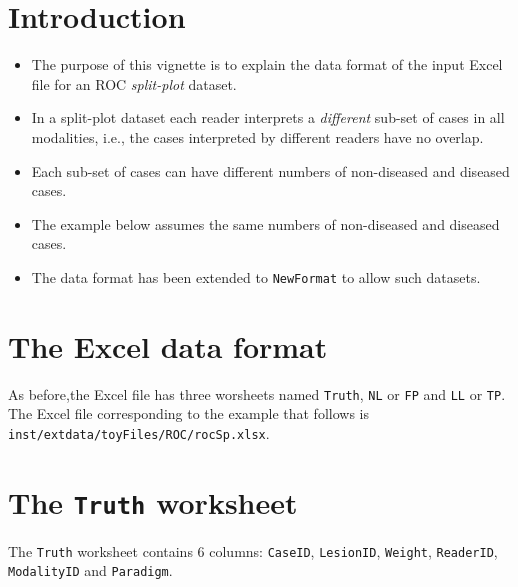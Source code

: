 \documentclass[]{book}
\providecommand{\tightlist}{%
  \setlength{\itemsep}{0pt}\setlength{\parskip}{0pt}}
\begin{document}
\hypertarget{introduction-2}{%
\section{Introduction}\label{introduction-2}}

\begin{itemize}
\tightlist
\item
  The purpose of this vignette is to explain the data format of the input Excel file for an ROC \emph{split-plot} dataset.
\item
  In a split-plot dataset each reader interprets a \emph{different} sub-set of cases in all modalities, i.e., the cases interpreted by different readers have no overlap.
\item
  Each sub-set of cases can have different numbers of non-diseased and diseased cases.
\item
  The example below assumes the same numbers of non-diseased and diseased cases.
\item
  The data format has been extended to \texttt{NewFormat} to allow such datasets.
\end{itemize}

\hypertarget{the-excel-data-format-2}{%
\section{The Excel data format}\label{the-excel-data-format-2}}

As before,the Excel file has three worsheets named \texttt{Truth}, \texttt{NL} or \texttt{FP} and \texttt{LL} or \texttt{TP}. The Excel file corresponding to the example that follows is \texttt{inst/extdata/toyFiles/ROC/rocSp.xlsx}.

\hypertarget{the-truth-worksheet-2}{%
\section{\texorpdfstring{The \texttt{Truth} worksheet}{The Truth worksheet}}\label{the-truth-worksheet-2}}

The \texttt{Truth} worksheet contains 6 columns: \texttt{CaseID}, \texttt{LesionID}, \texttt{Weight}, \texttt{ReaderID}, \texttt{ModalityID} and \texttt{Paradigm}.
\end{document}
